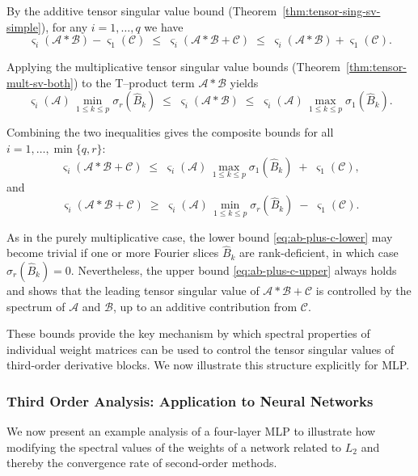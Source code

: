 \documentclass{article}
\theoremstyle{plain}
\theoremstyle{definition}
\theoremstyle{remark}
\begin{document}
By the additive tensor singular value bound
(Theorem~\ref{thm:tensor-sing-sv-simple}), for any $i=1,\dots,q$ we have
\[
\varsigma_i(\mathcal{A} * \mathcal{B}) - \varsigma_1(\mathcal{C})
\;\le\;
\varsigma_i(\mathcal{A} * \mathcal{B} + \mathcal{C})
\;\le\;
\varsigma_i(\mathcal{A} * \mathcal{B}) + \varsigma_1(\mathcal{C}).
\]

Applying the multiplicative tensor singular value bounds
(Theorem~\ref{thm:tensor-mult-sv-both}) to the T--product term
$\mathcal{A} * \mathcal{B}$ yields
\[
\varsigma_i(\mathcal{A})\,
\min_{1\le k\le p}\sigma_r(\widehat{B}_k)
\;\le\;
\varsigma_i(\mathcal{A} * \mathcal{B})
\;\le\;
\varsigma_i(\mathcal{A})\,
\max_{1\le k\le p}\sigma_1(\widehat{B}_k).
\]

Combining the two inequalities gives the composite bounds
for all $i = 1,\dots,\min\{q,r\}$:
\begin{equation}
\label{eq:ab-plus-c-upper}
\varsigma_i(\mathcal{A} * \mathcal{B} + \mathcal{C})
\;\le\;
\varsigma_i(\mathcal{A})\,
\max_{1\le k\le p}\sigma_1(\widehat{B}_k)
\;+\;
\varsigma_1(\mathcal{C}),
\end{equation}
and
\begin{equation}
\label{eq:ab-plus-c-lower}
\varsigma_i(\mathcal{A} * \mathcal{B} + \mathcal{C})
\;\ge\;
\varsigma_i(\mathcal{A})\,
\min_{1\le k\le p}\sigma_r(\widehat{B}_k)
\;-\;
\varsigma_1(\mathcal{C}).
\end{equation}

As in the purely multiplicative case, the lower bound
\eqref{eq:ab-plus-c-lower} may become trivial if one or more Fourier slices
$\widehat{B}_k$ are rank-deficient, in which case
$\sigma_r(\widehat{B}_k)=0$. Nevertheless, the upper bound
\eqref{eq:ab-plus-c-upper} always holds and shows that the leading tensor
singular value of $\mathcal{A} * \mathcal{B} + \mathcal{C}$ is controlled by
the spectrum of $\mathcal{A}$ and $\mathcal{B}$, up to an additive contribution
from $\mathcal{C}$.

These bounds provide the key mechanism by which spectral properties of
individual weight matrices can be used to control the tensor singular values
of third-order derivative blocks. We now illustrate this structure explicitly
for MLP.

\subsubsection{Third Order Analysis: Application to Neural Networks}

We now present an example analysis of a four-layer MLP to illustrate how modifying the spectral values of the weights of a network related to $L_2$ and thereby the convergence rate of second-order methods.
\end{document}
